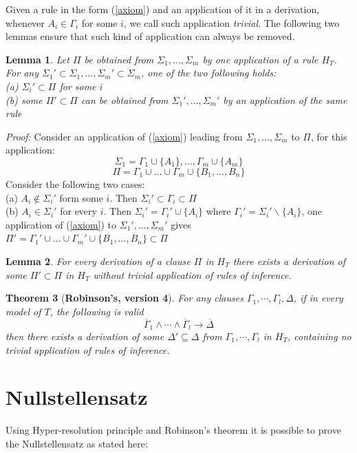 \documentclass[a4paper,12pt,twoside]{book}
\newtheorem{theorem}{Theorem}[chapter]
\newtheorem{lemma}[theorem]{Lemma}
\let\e\wedge
\begin{document}
Given a rule in the form (\ref{axiom}) and an application of it in a derivation, whenever $A_i \in \Gamma_i$ for some $i$, we call such application \textit{trivial}. The following two lemmas ensure that such kind of application can always be removed.

\begin{lemma}
Let $\Pi$ be obtained from $\Sigma_1,...,\Sigma_m$ by one application of a rule $H_T$. For any $\Sigma_1' \subset \Sigma_1,...,\Sigma_m' \subset \Sigma_m  $, one of the two following holds:\\
(a) $\Sigma_i' \subset \Pi$ for some $i$\\
(b) some $\Pi '\subset\Pi$ can be obtained from $\Sigma_1 ',...,\Sigma_m '$ by an application of the same rule
\end{lemma}

\emph{Proof:} Consider an application of (\ref{axiom}) leading from  $\Sigma_1,...,\Sigma_m$ to $\Pi$, for this application:
$$\Sigma_1=\Gamma_1\cup\{A_1\},...,\Gamma_m\cup\{A_m\}  $$
$$\Pi=\Gamma_1\cup ...\cup\Gamma_m\cup\{B_1,...,B_n\}$$
Consider the following two cases:\\
(a) $A_i \notin \Sigma_i '$ form some $i$. Then $\Sigma_i '\subset\Gamma_i\subset\Pi$
\\(b) $A_i \in \Sigma_i '$ for every $i$. Then $\Sigma_i '=\Gamma_i ' \cup \{A_i\}$ where $\Gamma_i '=\Sigma_i '\backslash \{A_i\}$, one application of (\ref{axiom}) to 
$\Sigma_1 ',...,\Sigma_m '$ gives 
$\Pi '=\Gamma_1 '\cup ...\cup\Gamma_m '\cup\{B_1,...,B_n\}\subset\Pi$

\begin{lemma}
For every derivation of a clause $\Pi$ in $H_T$ there exists a derivation of some $\Pi '\subset\Pi $ in $H_T$ without trivial application of rules of inference.
\end{lemma}

\begin{theorem}[\textbf{Robinson's, version 4}]
For any clauses $\Gamma_1, \cdots ,\Gamma_l , \Delta$, if in every model of $T$, the following is valid 
$$
\overline{\Gamma}_1\e\cdots\e\overline{\Gamma}_l \rightarrow \overline{\Delta}
$$
then there exists a derivation of some $\Delta' \subseteq \Delta$ from $\Gamma_1, \cdots ,\Gamma_l$ in $H_T$, containing no trivial application of rules of inference.
\end{theorem}


\chapter{Nullstellensatz}
Using Hyper-resolution principle and Robinson's theorem it is possible to prove the Nullstellensatz as stated here:
\end{document}
